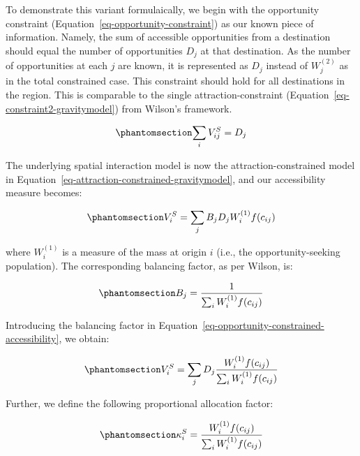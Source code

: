 \documentclass[
]{article}
\begin{document}
To demonstrate this variant formulaically, we begin with the opportunity
constraint (Equation~\ref{eq-opportunity-constraint}) as our known piece
of information. Namely, the sum of accessible opportunities from a
destination should equal the number of opportunities \(D_j\) at that
destination. As the number of opportunities at each \(j\) are known, it
is represented as \(D_j\) instead of \(W_j^(2)\) as in the total
constrained case. This constraint should hold for all destinations in
the region. This is comparable to the single attraction-constraint
(Equation~\ref{eq-constraint2-gravitymodel}) from Wilson's framework.

\begin{equation}\phantomsection\label{eq-opportunity-constraint}{
\sum_i V^S_{ij} =  D_j
}\end{equation}

The underlying spatial interaction model is now the
attraction-constrained model in
Equation~\ref{eq-attraction-constrained-gravitymodel}, and our
accessibility measure becomes:

\begin{equation}\phantomsection\label{eq-opportunity-constrained-accessibility}{
V^S_{i} = \sum_j B_j D_j W_i^{(1)} f(c_{ij})
}\end{equation}

\noindent where \(W_i^{(1)}\) is a measure of the mass at origin \(i\)
(i.e., the opportunity-seeking population). The corresponding balancing
factor, as per Wilson, is:

\begin{equation}\phantomsection\label{eq-opportunity-constrained-proportionality-constants}{
B_j = \frac{1}{\sum_i W_i^{(1)} f(c_{ij})}
}\end{equation}

Introducing the balancing factor in
Equation~\ref{eq-opportunity-constrained-accessibility}, we obtain:

\begin{equation}\phantomsection\label{eq-opportunity-constrained-accessibility-with-balancing-factor}{
V^S_{i} = \sum_j D_j \frac{W_i^{(1)} f(c_{ij})}{\sum_i W_i^{(1)} f(c_{ij})}
}\end{equation}

Further, we define the following proportional allocation factor:

\begin{equation}\phantomsection\label{eq-opportunity-constrained-proportional-allocation-factor}{
\kappa^S_{i} = \frac{W_i^{(1)} f(c_{ij})}{\sum_i W_i^{(1)} f(c_{ij})}
}\end{equation}
\end{document}
